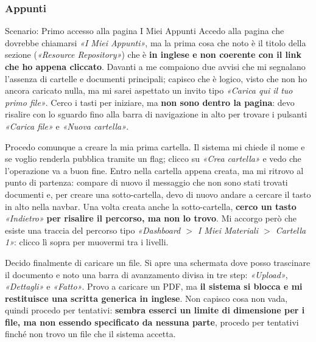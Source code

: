 \subsubsection{Appunti}

\begin{scenario}{Scenario: Primo accesso alla pagina I Miei Appunti}
  Accedo alla pagina che dovrebbe chiamarsi \textit{«I Miei Appunti»}, ma la prima cosa che noto è il titolo della sezione (\textit{«Resource Repository»}) che è \textbf{in inglese e non coerente con il link che ho appena cliccato}. Davanti a me compaiono due avvisi che mi segnalano l'assenza
  di cartelle e documenti principali; capisco che è logico, visto che non ho ancora caricato nulla, ma mi sarei aspettato un invito tipo \textit{«Carica qui il tuo primo file»}. Cerco i tasti per iniziare, ma \textbf{non sono dentro la pagina}: devo
  risalire con lo sguardo fino alla barra di navigazione in alto per trovare i pulsanti \textit{«Carica file»} e \textit{«Nuova cartella»}. 

  Procedo comunque a creare la mia prima cartella. Il sistema mi chiede il nome e se voglio renderla pubblica tramite un flag; clicco su \textit{«Crea cartella»} e vedo che l'operazione va a buon fine. Entro nella cartella appena creata, ma mi ritrovo al punto di partenza: compare di nuovo il messaggio che non sono stati trovati documenti e, per creare una sotto-cartella, devo di nuovo andare a cercare il tasto in alto nella navbar. Una volta creata anche la sotto-cartella, \textbf{cerco un tasto} \textit{«Indietro»} \textbf{per risalire il percorso, ma non lo trovo}. Mi accorgo
  però che esiste una traccia del percorso tipo \textit{«Dashboard $>$ I Miei Materiali $>$ Cartella 1»}: clicco lì sopra per muovermi tra i livelli.

  Decido finalmente di caricare un file. Si apre una schermata dove posso trascinare il documento e noto una barra di avanzamento divisa in tre step: \textit{«Upload»}, \textit{«Dettagli»} e \textit{«Fatto»}. Provo a caricare un PDF, ma \textbf{il sistema si blocca e mi restituisce una scritta generica in inglese}. Non capisco cosa non vada, quindi procedo per tentativi: \textbf{sembra esserci un limite di dimensione per i file, ma non essendo specificato da nessuna parte}, procedo per tentativi finché non trovo un file che il sistema accetta.


\end{scenario}
